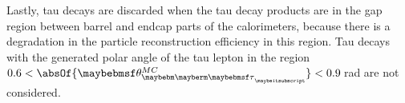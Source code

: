 Lastly, tau decays are discarded when the tau decay products are in the gap region between barrel and  endcap parts of the calorimeters, because there is a degradation in the particle reconstruction efficiency in this region. Tau decays with the generated polar angle of the tau lepton in the region $0.6 < \absOf{\theta_{\Ptau}^{MC}} < 0.9$\,rad are not considered.













